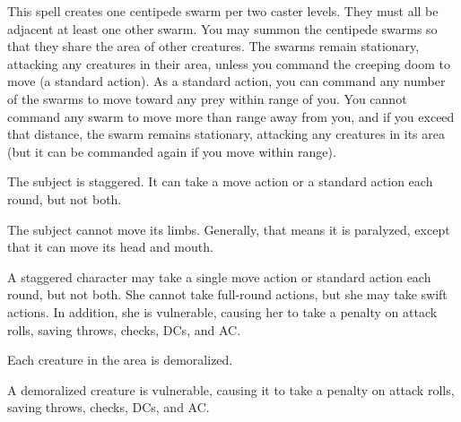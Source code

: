 \spelldur{\durmed}
\begin{spelleffect}
  This spell creates one centipede swarm per two caster levels. They must all be adjacent at least one other swarm. You may summon the centipede swarms so that they share the area of other creatures. The swarms remain stationary, attacking any creatures in their area, unless you command the creeping doom to move (a standard action). As a standard action, you can command any number of the swarms to move toward any prey within \rngmed range of you. You cannot command any swarm to move more than \rngmed range away from you, and if you exceed that distance, the swarm remains stationary, attacking any creatures in its area (but it can be commanded again if you move within range).
\end{spelleffect}

\spellrng{\rngmed}
\spelldur{\durshort}
\begin{spellhealthy}
  The subject is staggered. It can take a move action or a standard action each round, but not both. 
\end{spellhealthy}
\begin{spellblood}
  The subject cannot move its limbs. Generally, that means it is paralyzed, except that it can move its head and mouth.
\end{spellblood}
\begin{spellnotes}
 A staggered character may take a single move action or standard action each round, but not both. She cannot take full-round actions, but she may take swift actions. In addition, she is vulnerable, causing her to take a  penalty on attack rolls, saving throws, checks, DCs, and AC.
\end{spellnotes}

\spelldur{\durmed}
\begin{spelleffect}
  Each creature in the area is demoralized.
\end{spelleffect}
\begin{spellnotes}
  A demoralized creature is vulnerable, causing it to take a  penalty on attack rolls, saving throws, checks, DCs, and AC.
\end{spellnotes}

